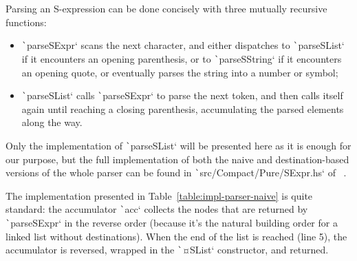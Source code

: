 \documentclass[english]{jflart}
\begin{document}
Parsing an S-expression can be done concisely with three mutually recursive functions:
\begin{itemize}
  \item \texttt`parseSExpr` scans the next character, and either dispatches to \texttt`parseSList` if it encounters an opening parenthesis, or to \texttt`parseSString` if it encounters an opening quote, or eventually parses the string into a number or symbol;
  \item \texttt`parseSList` calls \texttt`parseSExpr` to parse the next token, and then calls itself again until reaching a closing parenthesis, accumulating the parsed elements along the way.
\end{itemize}

Only the implementation of \texttt`parseSList` will be presented here as it is enough for our purpose, but the full implementation of both the naive and destination-based versions of the whole parser can be found in \texttt`src/Compact/Pure/SExpr.hs` of~\cite{linear_dest} .

The implementation presented in Table~\ref{table:impl-parser-naive} is quite standard: the accumulator \texttt`acc` collects the nodes that are returned by \texttt`parseSExpr` in the reverse order (because it's the natural building order for a linked list without destinations). When the end of the list is reached (line 5), the accumulator is reversed, wrapped in the \texttt`¤SList` constructor, and returned.
\end{document}
